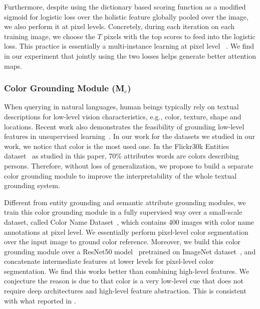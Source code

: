 Furthermore,
despite using the dictionary based scoring function as a modified sigmoid for logistic loss over
the holistic feature globally pooled over the image,
we also perform it at pixel levels.     %
Concretely,
during each iteration on each training image,
we choose the $T$ pixels with the top scores to feed into the logistic loss.
This practice is essentially a multi-instance learning at pixel level ~\citep{paul2018w}.
We find in our experiment that jointly using the two losses helps generate
better attention maps.



\subsubsection{Color Grounding Module (M$_{c}$)}
When querying in natural languages,
human beings typically rely on textual descriptions for low-level vision characteristics,
e.g., color, texture, shape and locations.
Recent work also demonstrates the feasibility of grounding low-level features in unsupervised learning~\citep{vondrick2018tracking}.
In our work for the datasets we studied in our work,
we notice that color is the most used one.
In the Flickr30k Entities dataset~\citep{plummer2015flickr30k} as studied in this paper, 
70\% attributes words are colors describing persons. 
Therefore, 
without loss of generalization, 
we propose to build a separate color grounding module to
improve the interpretability of the whole textual grounding system.


Different from entity grounding and semantic attribute grounding modules,
we train this color grounding module in a fully supervised way over a small-scale dataset, called Color Name Dataset~\citep{van2007learning},
which contains 400 images with color name annotations at pixel level.
We essentially perform pixel-level color segmentation over the input image
to ground color reference. Moreover, we build this color grounding module over a ResNet50 model~\citep{he2016deep} pretrained on ImageNet dataset~\citep{deng2009imagenet}, and concatenate intermediate features at lower levels for pixel-level color segmentation. We find this works better than combining high-level features. We conjecture the reason is due to that color is a very low-level cue that does not require deep architectures and high-level feature abstraction. This is consistent with what reported in \citep{larsson2016learning}.





